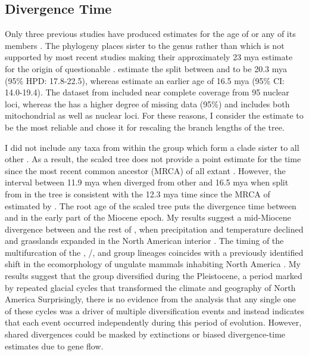 \subsection{Divergence Time}
Only three previous studies have produced estimates for the age of \anaxyrus
or any of its members \parencite{frazao2015,feng2017,portik2023}.
The \textcite{frazao2015} phylogeny places \anaxyrus sister to the genus \rhinella rather 
than \incilius which is not supported by most recent studies making 
their approximately 23 mya estimate for the origin of \anaxyrus questionable \parencite{feng2017,portik2023,pyron2011}. 
\textcite{portik2023} estimate the split between \anaxyrus and \incilius to be
20.3 mya (95\% HPD: 17.8-22.5), whereas \textcite{feng2017} estimate an earlier 
age of 16.5 mya (95\% CI: 14.0-19.4).
The dataset from \textcite{feng2017} included near complete coverage from 95 nuclear loci, 
whereas the \textcite{portik2023} has a higher degree of missing data (95\%)
and includes both mitochondrial as well as nuclear loci. 
For these reasons, I consider the \textcite{feng2017} estimate to be the most reliable
and chose it for rescaling the branch lengths of the \phycoeval tree.

I did not include any \anaxyrus taxa from within the \boreas group which form a 
clade sister to all other \anaxyrus.
As a result, the scaled \phycoeval tree does not provide a point estimate for 
the time since the most recent common ancestor (MRCA) of all extant \anaxyrus.
However, the interval between 11.9 mya when \punctatus diverged from other \anaxyrus and 
16.5 mya when \anaxyrus split from \incilius in the \phycoeval tree is consistent
with the 12.3 mya time since the MRCA of \anaxyrus estimated by \textcite{feng2017}.
The root age of the scaled \phycoeval tree puts the divergence time between \anaxyrus 
and \incilius in the early part of the Miocene epoch.
My results suggest a mid-Miocene divergence between \punctatus and the rest of 
\anaxyrus, when precipitation and temperature declined and grasslands expanded in 
the North American interior \parencite{morales-garcia2020}.
The timing of the multifurcation of the \quercicus, \cognatus/\speciosus, and 
\americanus group lineages coincides with a previously identified shift in the
ecomorphology of ungulate mammals inhabiting North America \parencite{morales-garcia2020}.
My results suggest that the \americanus group diversified during the Pleistocene,
a period marked by repeated glacial cycles that transformed the climate and geography
of North America \parencite{holman1995}
Surprisingly, there is no evidence from the \phycoeval analysis that any single 
one of these cycles was a driver of multiple diversification events and instead 
indicates that each event occurred independently during this period of \anaxyrus evolution.
However, shared divergences could be masked by extinctions or biased 
divergence-time estimates due to gene flow.


